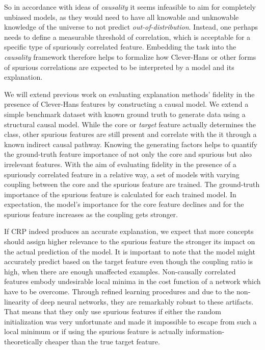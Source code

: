 So in accordance with ideas of \textit{causality} it seems infeasible to aim for completely unbiased models, as they would need to have all knowable and unknowable knowledge of the universe to not predict \textit{out-of-distribution}. 
Instead, one perhaps needs to define a measurable threshold of correlation, which is acceptable for a specific type of spuriously correlated feature. 
Embedding the task into the \textit{causality} framework therefore helps to formalize how Clever-Hans or other forms of spurious correlations are expected to be interpreted by a model and its explanation.  

We will extend previous work on evaluating explanation methods' fidelity in the presence of Clever-Hans features by constructing a causal model. We extend a simple benchmark dataset with known ground truth to generate data using a structural causal model.
While the core or \textit{target} feature actually determines the class, other spurious features are still present and correlate with the it through a known indirect causal pathway.
Knowing the generating factors helps to quantify the ground-truth feature importance of not only the core and spurious but also irrelevant features.
With the aim of evaluating fidelity in the presence of a spuriously correlated feature in a relative way, a set of models with varying coupling between the core and the spurious feature are trained. The ground-truth importance of the spurious feature is calculated for each trained model. In expectation, the model's importance for the core feature declines and for the spurious feature increases as the coupling gets stronger.

If CRP indeed produces an accurate explanation, we expect that more concepts should assign higher relevance to the spurious feature the stronger its impact on the actual prediction of the model. It is important to note that the model might accurately predict based on the target feature even though the coupling ratio is high, when there are enough unaffected examples. Non-causally correlated features embody undesirable local minima in the cost function of a network which have to be overcome. Through refined learning procedures and due to the non-linearity of deep neural networks, they are remarkably robust to these artifacts. That means that they only use spurious features if either the random initialization was very unfortunate and made it impossible to escape from such a local minimum or if using the spurious feature is actually information-theoretically cheaper than the true target feature. 

